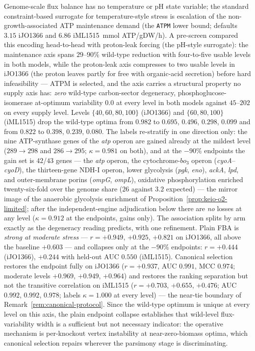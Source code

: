 \begin{proposition}
\label{prop:keio-atpm}
Genome-scale flux balance has no temperature or pH state variable;
the standard constraint-based surrogate for temperature-style
stress is escalation of the non-growth-associated ATP maintenance
demand (the \texttt{ATPM} lower bound; defaults $3.15$ iJO1366 and
$6.86$ iML1515~mmol ATP/gDW/h). A pre-screen compared this encoding
head-to-head with proton-leak forcing (the pH-style surrogate): the
maintenance axis spans $29$--$90\%$ wild-type reduction with
four-to-five usable levels in both models, while the proton-leak
axis compresses to two usable levels in iJO1366 (the proton leaves
partly for free with organic-acid secretion) before hard
infeasibility --- ATPM is selected, and the axis carries a
structural property no supply axis has: \emph{zero} wild-type
carbon-sector degeneracy, phosphoglucose-isomerase at-optimum
variability $0.0$ at every level in both models against $45$--$202$
on every supply level. Levels $\{40,60,80,100\}$ (iJO1366) and
$\{60,80,100\}$ (iML1515) drop the wild-type optima from $0.982$ to
$0.695$, $0.496$, $0.298$, $0.099$ and from $0.822$ to $0.398$,
$0.239$, $0.080$. The labels re-stratify in one direction only:
the nine ATP-synthase genes of the \emph{atp} operon are gained
already at the mildest level ($289\to298$ and $286\to295$;
$\kappa=0.981$ on both), and at the $-90\%$ endpoints the gain set
is $42$/$43$ genes --- the \emph{atp} operon, the
cytochrome-$bo_3$ operon (\emph{cyoA}--\emph{cyoD}), the
thirteen-gene NDH-I operon, lower glycolysis (\emph{pgk},
\emph{eno}), \emph{ackA}, \emph{lpd}, and outer-membrane porins
(\emph{ompG}, \emph{ompL}), oxidative phosphorylation enriched
twenty-six-fold over the genome share ($26$ against $3.2$
expected) --- the mirror image of the anaerobic glycolysis
enrichment of Proposition~\ref{prop:keio-o2-limited}; after the
independent-engine adjudication below there are \emph{no} losses at
any level ($\kappa=0.912$ at the endpoints, gains only). The
association splits by arm exactly as the degeneracy reading
predicts, with one refinement. Plain FBA is \emph{strong at
moderate stress} --- $r=+0.949$, $+0.925$, $+0.821$ on iJO1366, all
above the baseline $+0.603$ --- and collapses only at the $-90\%$
endpoints: $r=+0.444$ (iJO1366), $+0.244$ with held-out AUC
$0.550$ (iML1515). Canonical selection restores the endpoint fully
on iJO1366 ($r=+0.937$, AUC $0.991$, MCC $0.974$; moderate levels
$+0.969$, $+0.949$, $+0.964$) and restores the ranking separation
but not the transitive correlation on iML1515 ($r=+0.703$,
$+0.655$, $+0.476$; AUC $0.992$, $0.992$, $0.978$; labels
$\kappa=1.000$ at every level) --- the near-tie boundary of
Remark~\ref{rem:canonical-protocol}. Since the wild-type optimum is
unique at every level on this axis, the plain endpoint collapse
establishes that wild-level flux-variability width is a sufficient
but not necessary indicator: the operative mechanism is per-knockout
vertex instability at near-zero-biomass optima, which canonical
selection repairs wherever the parsimony stage is discriminating.
\end{proposition}

